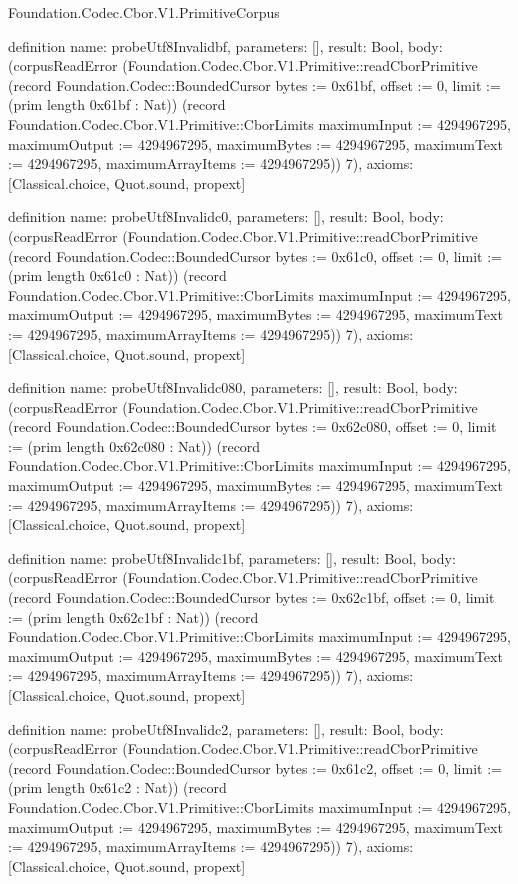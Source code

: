 \begin{lexlean}{Foundation.Codec.Cbor.V1.PrimitiveCorpus}
\begin{semanticmodule}
definition{
  name: probeUtf8Invalidbf,
  parameters: [],
  result: Bool,
  body: (corpusReadError (Foundation.Codec.Cbor.V1.Primitive::readCborPrimitive (record Foundation.Codec::BoundedCursor {bytes := 0x61bf, offset := 0, limit := (prim length 0x61bf : Nat)}) (record Foundation.Codec.Cbor.V1.Primitive::CborLimits {maximumInput := 4294967295, maximumOutput := 4294967295, maximumBytes := 4294967295, maximumText := 4294967295, maximumArrayItems := 4294967295})) 7),
  axioms: [Classical.choice, Quot.sound, propext]
}

definition{
  name: probeUtf8Invalidc0,
  parameters: [],
  result: Bool,
  body: (corpusReadError (Foundation.Codec.Cbor.V1.Primitive::readCborPrimitive (record Foundation.Codec::BoundedCursor {bytes := 0x61c0, offset := 0, limit := (prim length 0x61c0 : Nat)}) (record Foundation.Codec.Cbor.V1.Primitive::CborLimits {maximumInput := 4294967295, maximumOutput := 4294967295, maximumBytes := 4294967295, maximumText := 4294967295, maximumArrayItems := 4294967295})) 7),
  axioms: [Classical.choice, Quot.sound, propext]
}

definition{
  name: probeUtf8Invalidc080,
  parameters: [],
  result: Bool,
  body: (corpusReadError (Foundation.Codec.Cbor.V1.Primitive::readCborPrimitive (record Foundation.Codec::BoundedCursor {bytes := 0x62c080, offset := 0, limit := (prim length 0x62c080 : Nat)}) (record Foundation.Codec.Cbor.V1.Primitive::CborLimits {maximumInput := 4294967295, maximumOutput := 4294967295, maximumBytes := 4294967295, maximumText := 4294967295, maximumArrayItems := 4294967295})) 7),
  axioms: [Classical.choice, Quot.sound, propext]
}

definition{
  name: probeUtf8Invalidc1bf,
  parameters: [],
  result: Bool,
  body: (corpusReadError (Foundation.Codec.Cbor.V1.Primitive::readCborPrimitive (record Foundation.Codec::BoundedCursor {bytes := 0x62c1bf, offset := 0, limit := (prim length 0x62c1bf : Nat)}) (record Foundation.Codec.Cbor.V1.Primitive::CborLimits {maximumInput := 4294967295, maximumOutput := 4294967295, maximumBytes := 4294967295, maximumText := 4294967295, maximumArrayItems := 4294967295})) 7),
  axioms: [Classical.choice, Quot.sound, propext]
}

definition{
  name: probeUtf8Invalidc2,
  parameters: [],
  result: Bool,
  body: (corpusReadError (Foundation.Codec.Cbor.V1.Primitive::readCborPrimitive (record Foundation.Codec::BoundedCursor {bytes := 0x61c2, offset := 0, limit := (prim length 0x61c2 : Nat)}) (record Foundation.Codec.Cbor.V1.Primitive::CborLimits {maximumInput := 4294967295, maximumOutput := 4294967295, maximumBytes := 4294967295, maximumText := 4294967295, maximumArrayItems := 4294967295})) 7),
  axioms: [Classical.choice, Quot.sound, propext]
}


\end{semanticmodule}
\end{lexlean}

